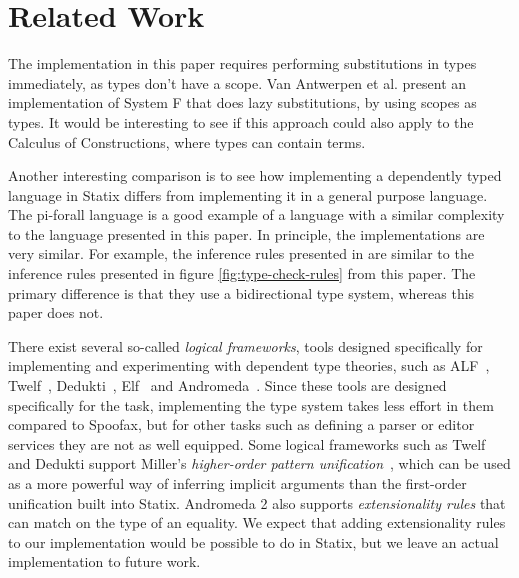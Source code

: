 \chapter{Related Work}
The implementation in this paper requires performing substitutions in types immediately, as types don't have a scope. Van Antwerpen et al. \cite[sect 2.5]{scopes_as_types} present an implementation of System F that does lazy substitutions, by using scopes as types. It would be interesting to see if this approach could also apply to the Calculus of Constructions, where types can contain terms. 

Another interesting comparison is to see how implementing a dependently typed language in Statix differs from implementing it in a general purpose language. The pi-forall language\cite{pi_forall} is a good example of a language with a similar complexity to the language presented in this paper. In principle, the implementations are very similar. For example, the inference rules presented in \cite{pi_forall} are similar to the inference rules presented in figure \ref{fig:type-check-rules} from this paper. The primary difference is that they use a bidirectional type system, whereas this paper does not.

There exist several so-called \emph{logical frameworks}, tools designed specifically for implementing and experimenting with dependent type theories, such as ALF~\cite{MagnussonN93}, Twelf~\cite{PfenningS99}, Dedukti~\cite{BoespflugCH12}, Elf~\cite{pfenning_1991} and Andromeda~\cite{BauerHP20}. Since these tools are designed specifically for the task, implementing the type system takes less effort in them compared to Spoofax, but for other tasks such as defining a parser or editor services they are not as well equipped. Some logical frameworks such as Twelf and Dedukti support Miller's \emph{higher-order pattern unification}~\cite{Miller89}, which can be used as a more powerful way of inferring implicit arguments than the first-order unification built into Statix. Andromeda 2 also supports \emph{extensionality rules} that can match on the type of an equality. We expect that adding extensionality rules to our implementation would be possible to do in Statix, but we leave an actual implementation to future work.